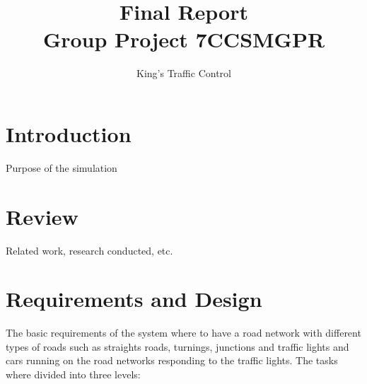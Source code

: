 \documentclass{article} \usepackage{graphicx}
\begin{document}
	
	\title{Final Report
    \\ Group Project 7CCSMGPR} 	
    \author{King's Traffic Control}
	\maketitle
	
	\section{Introduction}
		Purpose of the simulation
	\section{Review}
		Related work, research conducted, etc.
	\section{Requirements and Design}
			The basic requirements of the system where to have a road network with different types of roads such as straights roads, turnings, junctions and traffic lights and cars running on the road networks responding to the traffic lights.
			 The tasks where divided into three levels:
\end{document}
